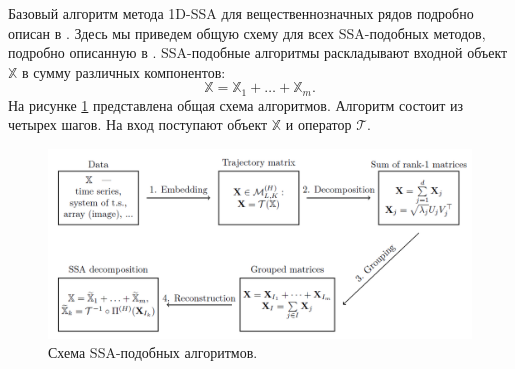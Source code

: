 \documentclass[specialist,
               substylefile = spbu.rtx,
               subf,href,colorlinks=true, 12pt]{disser}
\begin{document}
Базовый алгоритм метода 1D-SSA для вещественнозначных рядов подробно описан в \cite{Golyandina.etal2001}. 
Здесь мы приведем общую схему для всех SSA-подобных методов, подробно описанную в \cite{Rssa}. 
SSA-подобные алгоритмы раскладывают входной объект $\mathbb{X}$ в сумму различных компонентов:
\begin{equation*}
\mathbb{X} = {\mathbb{X}}_1 + \ldots + {\mathbb{X}}_m.
\end{equation*}
На рисунке \ref{fig:ssa_scheme} представлена общая схема алгоритмов. 
Алгоритм состоит из четырех шагов. На вход поступают объект $\mathbb{X}$ и оператор $\mathcal{T}$.
\begin{figure}[!hhh]
	\begin{center}
	\includegraphics[width = 6in]{scheme_ssa}
	\end{center}
	\caption{Схема SSA-подобных алгоритмов.}
	\label{fig:ssa_scheme}
\end{figure}
\end{document}
